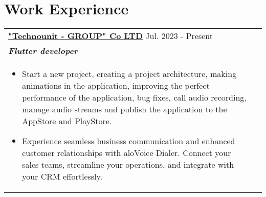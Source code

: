 \documentclass[a4paper,8pt]{article}
\begin{document}
\section{Work Experience}
\begin{tabularx}{\linewidth}{ @{}l r@{} }
\color[HTML]{1C033C} \textbf{\uline{\href{https://technounit.uz/}{"Technounit - GROUP" Co LTD}}} \hfill \color[HTML]{371e77} Jul. 2023 - Present \\[4pt]
\color[HTML]{371e77}\textbf{\textit{Flutter developer}}\
\hfill \color[HTML]{4B28A4} \textit{
} \\[5pt]
\begin{minipage}[t]{\linewidth}
    \begin{itemize}[nosep,after=\strut, leftmargin=2em, itemsep=2pt]
        \item Start a new project, creating a project architecture, making animations in the application, improving the perfect performance of the application, bug fixes, call audio recording, manage audio streams and publish the application to the AppStore and PlayStore.
        \item Experience seamless business communication and enhanced customer relationships with aloVoice Dialer. Connect your sales teams, streamline your operations, and integrate with your CRM effortlessly.
    \end{itemize}
\end{minipage}
\end{tabularx}
\end{document}
